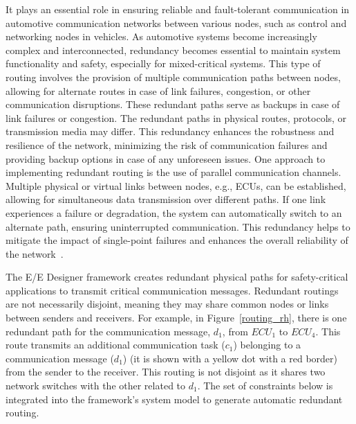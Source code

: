      It plays an essential role in ensuring reliable and fault-tolerant communication in automotive communication networks between various nodes, such as control and networking nodes in vehicles. As automotive systems become increasingly complex and interconnected, redundancy becomes essential to maintain system functionality and safety, especially for mixed-critical systems.  
    This type of routing involves the provision of multiple communication paths between nodes, allowing for alternate routes in case of link failures, congestion, or other communication disruptions. These redundant paths serve as backups in case of link failures or congestion. The redundant paths in physical routes, protocols, or transmission media may differ. This redundancy enhances the robustness and resilience of the network, minimizing the risk of communication failures and providing backup options in case of any unforeseen issues.
    One approach to implementing redundant routing is the use of parallel communication channels. Multiple physical or virtual links between nodes, e.g., ECUs, can be established, allowing for simultaneous data transmission over different paths. If one link experiences a failure or degradation, the system can automatically switch to an alternate path, ensuring uninterrupted communication. This redundancy helps to mitigate the impact of single-point failures and enhances the overall reliability of the network~\cite{iso26262, smirnov2018automatic, 9565115, askaripoor2023designer}. 
    
    The E/E Designer framework creates redundant physical paths for safety-critical applications to transmit critical communication messages. Redundant routings are not necessarily disjoint, meaning they may share common nodes or links between senders and receivers. For example, in Figure~\ref{routing_rh}, there is one redundant path for the communication message, $d_1$, from $ECU_1$ to $ECU_4$. This route transmits an additional communication task ($c_1$) belonging to a communication message ($d_1$) (it is shown with a yellow dot with a red border) from the sender to the receiver. This routing is not disjoint as it shares two network switches with the other related to $d_1$. The set of constraints below is integrated into the framework's system model to generate automatic redundant routing. \newline  
    
    
